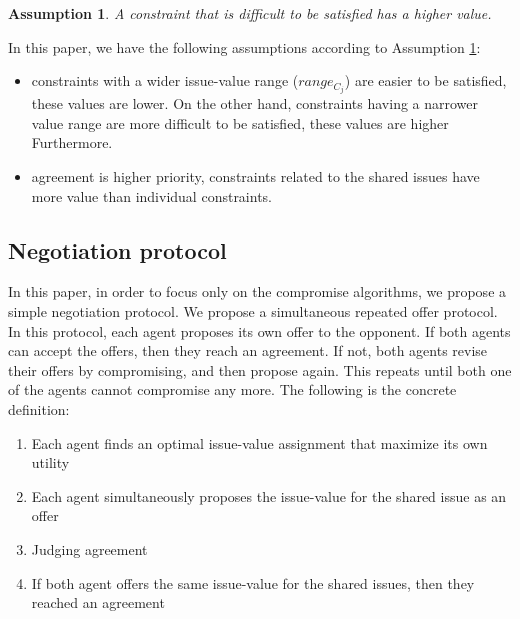 \documentclass[paper]{ieice}
\begin{document}
 \newtheorem{assum}{Assumption} %
\begin{assum}\label{assumption1}
A constraint that is difficult to be satisfied has a higher value. 
\end{assum}

In this paper, we have the following assumptions according to Assumption \ref{assumption1}:

\begin{itemize}
\item constraints with a wider issue-value range ($range_{C_j}$) are easier to be satisfied, these values are lower. On the other hand, constraints having a narrower value range are more difficult to be satisfied, these values are higher Furthermore.
\item agreement is higher priority, constraints related to the shared issues have more value than individual constraints. 
\end{itemize}













\subsection{Negotiation protocol}

In this paper, in order to focus only on the compromise algorithms, we propose a simple negotiation protocol. We propose a simultaneous repeated offer protocol. In this protocol, each agent proposes its own offer to the opponent. If both agents can accept the offers, then they reach an agreement. If not, both agents revise their offers by compromising, and then propose again. This repeats until both one of the agents cannot compromise any more. The following is the concrete definition:


\begin{enumerate}
\renewcommand{\labelenumi}{(\arabic{enumi})}
\item Each agent finds an optimal issue-value assignment that maximize its own utility
\item Each agent simultaneously proposes the issue-value for the shared issue as an offer
\item Judging agreement
\item If both agent offers the same issue-value for the shared issues, then they reached an agreement
\end{enumerate}
\end{document}

